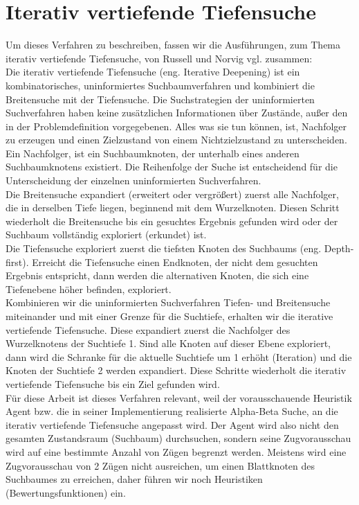\section{Iterativ vertiefende Tiefensuche}
\label{sec:Iterativ vertiefende Tiefensuche}
Um dieses Verfahren zu beschreiben, fassen wir die Ausführungen, zum Thema iterativ vertiefende Tiefensuche, von Russell und Norvig vgl. \cite[116]{Russell} zusammen:\\

Die iterativ vertiefende Tiefensuche (eng. Iterative Deepening) ist ein kombinatorisches, uninformiertes Suchbaumverfahren und kombiniert die Breitensuche mit der Tiefensuche. Die Suchstrategien der uninformierten Suchverfahren haben keine zusätzlichen Informationen über Zustände, außer den in der Problemdefinition vorgegebenen. Alles was sie tun können, ist, Nachfolger zu erzeugen und einen Zielzustand von einem Nichtzielzustand zu unterscheiden. Ein Nachfolger, ist ein Suchbaumknoten, der unterhalb eines anderen Suchbaumknotens existiert. Die Reihenfolge der Suche ist entscheidend für die Unterscheidung der einzelnen uninformierten Suchverfahren. \\
 
Die Breitensuche expandiert (erweitert oder vergrößert) zuerst alle Nachfolger, die in derselben Tiefe liegen, beginnend mit dem Wurzelknoten. Diesen Schritt wiederholt die Breitensuche bis ein gesuchtes Ergebnis gefunden wird oder der Suchbaum vollständig exploriert (erkundet) ist. \\

Die Tiefensuche exploriert zuerst die tiefsten Knoten des Suchbaums (eng. Depth-first). Erreicht die Tiefensuche einen Endknoten, der nicht dem gesuchten Ergebnis entspricht, dann werden die alternativen Knoten, die sich eine Tiefenebene höher befinden, exploriert. \\

Kombinieren wir die uninformierten Suchverfahren Tiefen- und Breitensuche miteinander und mit einer Grenze für die Suchtiefe, erhalten wir die iterative vertiefende Tiefensuche. Diese expandiert zuerst die Nachfolger des Wurzelknotens der Suchtiefe 1. Sind alle Knoten auf dieser Ebene exploriert, dann wird die Schranke für die aktuelle Suchtiefe um 1 erhöht (Iteration) und die Knoten der Suchtiefe 2 werden expandiert. Diese Schritte wiederholt die iterativ vertiefende Tiefensuche bis ein Ziel gefunden wird. \\  

Für diese Arbeit ist dieses Verfahren relevant, weil der vorausschauende Heuristik Agent bzw. die in seiner Implementierung realisierte Alpha-Beta Suche, an die iterativ vertiefende Tiefensuche angepasst wird. Der Agent wird also nicht den gesamten Zustandsraum (Suchbaum) durchsuchen, sondern seine Zugvorausschau wird auf eine bestimmte Anzahl von Zügen begrenzt werden. Meistens wird eine Zugvorausschau von 2 Zügen nicht ausreichen, um einen Blattknoten des Suchbaumes zu erreichen, daher führen wir noch Heuristiken (Bewertungsfunktionen) ein.\\

